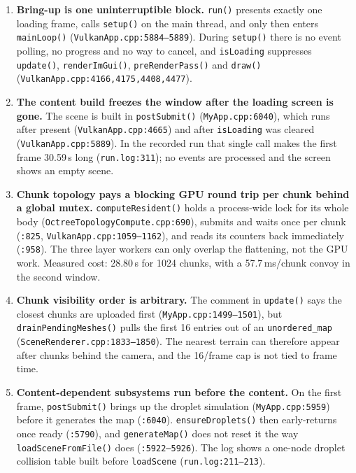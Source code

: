 \documentclass[11pt,a4paper]{article}
\begin{document}
\begin{enumerate}[leftmargin=1.5em,itemsep=3pt]
\item \textbf{Bring-up is one uninterruptible block.} \texttt{run()}
presents exactly one loading frame, calls \texttt{setup()} on the main thread,
and only then enters \texttt{mainLoop()} (\texttt{VulkanApp.cpp:5884--5889}).
During \texttt{setup()} there is no event polling, no progress and no way to
cancel, and \texttt{isLoading} suppresses \texttt{update()},
\texttt{renderImGui()}, \texttt{preRenderPass()} and \texttt{draw()}
(\texttt{VulkanApp.cpp:4166,4175,4408,4477}).
\item \textbf{The content build freezes the window after the loading screen is
gone.} The scene is built in \texttt{postSubmit()} (\texttt{MyApp.cpp:6040}),
which runs after present (\texttt{VulkanApp.cpp:4665}) and after
\texttt{isLoading} was cleared (\texttt{VulkanApp.cpp:5889}). In the recorded
run that single call makes the first frame 30.59\,s long
(\texttt{run.log:311}); no events are processed and the screen shows an empty
scene.
\item \textbf{Chunk topology pays a blocking GPU round trip per chunk behind a
global mutex.} \texttt{computeResident()} holds a process-wide lock for its
whole body (\texttt{OctreeTopologyCompute.cpp:690}), submits and waits once
per chunk (\texttt{:825}, \texttt{VulkanApp.cpp:1059--1162}), and reads its
counters back immediately (\texttt{:958}). The three layer workers can only
overlap the flattening, not the GPU work. Measured cost: 28.80\,s for 1024
chunks, with a 57.7\,ms/chunk convoy in the second window.
\item \textbf{Chunk visibility order is arbitrary.} The comment in
\texttt{update()} says the closest chunks are uploaded first
(\texttt{MyApp.cpp:1499--1501}), but \texttt{drainPendingMeshes()} pulls the
first 16 entries out of an \texttt{unordered\_map}
(\texttt{SceneRenderer.cpp:1833--1850}). The nearest terrain can therefore
appear after chunks behind the camera, and the 16/frame cap is not tied to
frame time.
\item \textbf{Content-dependent subsystems run before the content.} On the
first frame, \texttt{postSubmit()} brings up the droplet simulation
(\texttt{MyApp.cpp:5959}) before it generates the map (\texttt{:6040}).
\texttt{ensureDroplets()} then early-returns once ready (\texttt{:5790}), and
\texttt{generateMap()} does not reset it the way \texttt{loadSceneFromFile()}
does (\texttt{:5922--5926}). The log shows a one-node droplet collision table
built before \texttt{loadScene} (\texttt{run.log:211--213}).
\end{enumerate}
\end{document}
